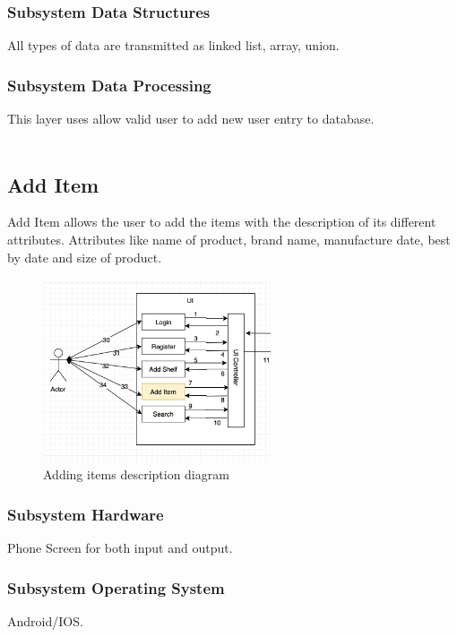 \subsubsection{Subsystem Data Structures}
All types of data are transmitted as linked list, array, union.

\subsubsection{Subsystem Data Processing}
This layer uses allow valid user to add new user entry to database.
\\
\\
\subsection{Add Item}
Add Item allows the user to add the items with the description of its different attributes. Attributes like name of product, brand name, manufacture date, best by date and size of product.


\begin{figure}[h!]
	\centering
 	\includegraphics[width=0.60\textwidth]{images/additem}

 \caption{Adding items description diagram}

\end{figure}

\subsubsection{Subsystem Hardware}
Phone Screen for both input and output.

\subsubsection{Subsystem Operating System}
Android/IOS.

